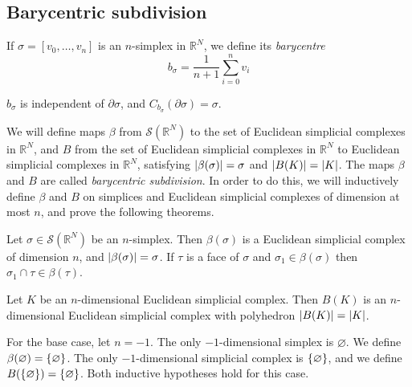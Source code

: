 \subsection{Barycentric subdivision}
\begin{definition}
	If \( \sigma = [v_0, \dots, v_n] \) is an \( n \)-simplex in \( \mathbb R^N \), we define its \emph{barycentre}
	\[ b_\sigma = \frac{1}{n+1}\sum_{i=0}^n v_i \]
\end{definition}
\begin{lemma}
	\( b_\sigma \) is independent of \( \partial\sigma \), and \( C_{b_\sigma}(\partial \sigma) = \sigma \).
\end{lemma}
We will define maps \( \beta \) from \( \mathcal S(\mathbb R^N) \) to the set of Euclidean simplicial complexes in \( \mathbb R^N \), and \( B \) from the set of Euclidean simplicial complexes in \( \mathbb R^N \) to Euclidean simplicial complexes in \( \mathbb R^N \), satisfying \( \abs{\beta(\sigma)} = \sigma \) and \( \abs{B(K)} = \abs{K} \).
The maps \( \beta \) and \( B \) are called \emph{barycentric subdivision}.
In order to do this, we will inductively define \( \beta \) and \( B \) on simplices and Euclidean simplicial complexes of dimension at most \( n \), and prove the following theorems.
\begin{theorem}
	Let \( \sigma \in \mathcal S(\mathbb R^N) \) be an \( n \)-simplex.
	Then \( \beta(\sigma) \) is a Euclidean simplicial complex of dimension \( n \), and \( \abs{\beta(\sigma)} = \sigma \).
	If \( \tau \) is a face of \( \sigma \) and \( \sigma_1 \in \beta(\sigma) \) then \( \sigma_1 \cap \tau \in \beta(\tau) \).
\end{theorem}
\begin{theorem}
	Let \( K \) be an \( n \)-dimensional Euclidean simplicial complex.
	Then \( B(K) \) is an \( n \)-dimensional Euclidean simplicial complex with polyhedron \( \abs{B(K)} = \abs{K} \).
\end{theorem}
For the base case, let \( n = -1 \).
The only \( -1 \)-dimensional simplex is \( \varnothing \).
We define \( \beta(\varnothing) = \qty{\varnothing} \).
The only \( -1 \)-dimensional simplicial complex is \( \qty{\varnothing} \), and we define \( B(\qty{\varnothing}) = \qty{\varnothing} \).
Both inductive hypotheses hold for this case.


